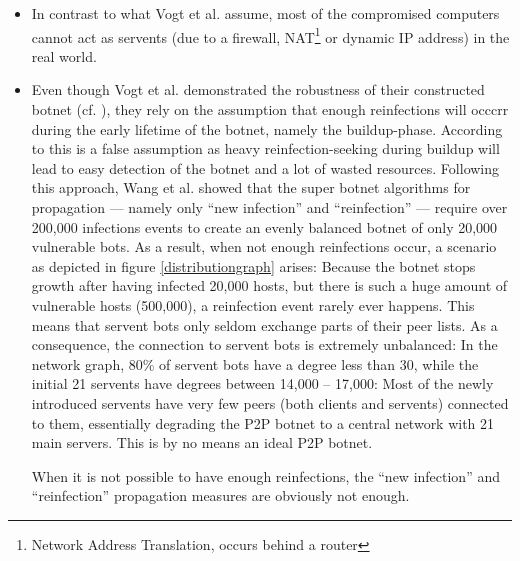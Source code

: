 \documentclass{llncs}
\begin{document}
\begin{itemize}
\item \label{nat} In contrast to what Vogt et al. assume, most of the
  compromised computers cannot act as servents (due to a firewall,
  NAT\footnote{Network Address Translation, occurs behind a router}
  or dynamic IP address) in the real world.
\item Even though Vogt et al. demonstrated the robustness of their
  constructed botnet (cf. \cite{vogt2007army}), they rely on the
  assumption that enough reinfections will occcrr during the early
  lifetime of the botnet, namely the buildup-phase. According to
  \cite{td1sc} this is a false assumption as heavy reinfection-seeking
  during buildup will lead to easy detection of the botnet and a lot
  of wasted resources. Following this approach, Wang et al. showed
  that the super botnet algorithms for propagation --- namely only
  ``new infection'' and ``reinfection'' --- require over 200,000
  infections events to create an evenly balanced botnet of only 20,000
  vulnerable bots. As a result, when not enough reinfections occur, a
  scenario as depicted in figure \ref{distributiongraph} arises:
  Because the botnet stops growth after having infected 20,000 hosts,
  but there is such a huge amount of vulnerable hosts (500,000), a
  reinfection event rarely ever happens. This means that servent bots
  only seldom exchange parts of their peer lists. As a consequence,
  the connection to servent bots is extremely unbalanced: In the
  network graph, 80\% of servent bots have a degree less than 30,
  while the initial 21 servents have degrees between 14,000 -- 17,000:
  Most of the newly introduced servents have very few peers (both
  clients and servents) connected to them, essentially degrading the
  P2P botnet to a central network with 21 main servers. This is by no
  means an ideal P2P botnet.

When it is not possible to have enough reinfections, the ``new
infection'' and ``reinfection'' propagation measures are obviously not
enough.
\end{itemize}
\end{document}
